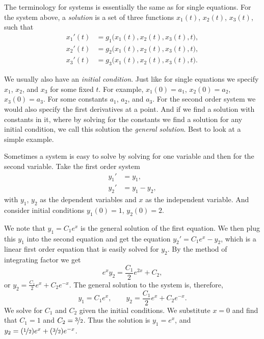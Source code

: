 The terminology for systems is essentially the same as for
single equations.
For the system above, a
\emph{solution}
is a set of three functions $x_1(t)$, $x_2(t)$, $x_3(t)$, such that
\begin{equation*}
\begin{aligned}
x_1'(t) &= g_1\bigl(x_1(t),x_2(t),x_3(t),t\bigr) , \\
x_2'(t) &= g_2\bigl(x_1(t),x_2(t),x_3(t),t\bigr) , \\
x_3'(t) &= g_3\bigl(x_1(t),x_2(t),x_3(t),t\bigr) .
\end{aligned}
\end{equation*}

We usually also have an
\emph{initial condition}.  Just like
for single equations we specify $x_1$, $x_2$, and $x_3$ for some fixed $t$.
For example, $x_1(0) = a_1$, $x_2(0) = a_2$, $x_3(0) = a_3$.
For some constants $a_1$, $a_2$, and $a_3$.  For the second order system
we would also specify the first derivatives at a point.
And if we find a solution with constants in it, where by solving for the
constants we find a solution for any initial condition, we call this
solution the \emph{general solution}.
Best to look at a simple example.

\begin{example}
Sometimes a system is easy to solve
by solving for one variable and then for the second variable.
Take 
the first order system
\begin{equation*}
\begin{aligned}
y_1' & = y_1 , \\
y_2' & = y_1 - y_2 ,
\end{aligned}
\end{equation*}
with $y_1$, $y_2$ as the dependent variables and $x$ as the independent
variable.  And consider initial conditions
$y_1(0) = 1$, $y_2(0) = 2$.

We note that $y_1 = C_1 e^x$ is the general solution of the first equation.
We then plug this $y_1$ into the second equation
and get the equation $y_2' = C_1e^x - y_2$, which is a linear first order
equation that is easily solved for $y_2$.  By the method of integrating
factor we get
\begin{equation*}
e^x y_2 = \frac{C_1}{2}e^{2x} + C_2 ,
\end{equation*}
or $y_2 = \frac{C_1}{2}e^{x} + C_2e^{-x}$.  The general solution to the system
is, therefore,
\begin{equation*}
y_1 = C_1 e^x , \qquad
y_2 = \frac{C_1}{2}e^{x} + C_2e^{-x} .
\end{equation*}
We solve for $C_1$ and $C_2$ given the initial conditions.
We substitute $x=0$ and find
that $C_1=1$ and $C_2=\nicefrac{3}{2}$.  Thus the solution is
$y_1 = e^x$, and
$y_2 = (\nicefrac{1}{2}) e^x + (\nicefrac{3}{2}) e^{-x}$.
\end{example}

